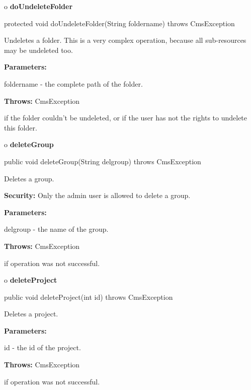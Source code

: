 o {\bf doUndeleteFolder}

\begin{PRE}
 protected void doUndeleteFolder(String foldername) throws CmsException
\end{PRE}

\begin{description}
\htmlDD Undeletes a folder. \htmlBR
This is a very complex operation, because all sub-resources may be undeleted
too.

\begin{description}
\item {\bf Parameters:}

foldername - the complete path of the folder.
\item {\bf Throws:} CmsException

if the folder couldn't be undeleted, or if the user has not the rights to
undelete this folder.
\end{description}

\end{description}

o {\bf deleteGroup}

\begin{PRE}
 public void deleteGroup(String delgroup) throws CmsException
\end{PRE}

\begin{description}
\htmlDD Deletes a group.

{\bf Security:} Only the admin user is allowed to delete a group.

\begin{description}
\item {\bf Parameters:}

delgroup - the name of the group.
\item {\bf Throws:} CmsException

if operation was not successful.
\end{description}

\end{description}

o {\bf deleteProject}

\begin{PRE}
 public void deleteProject(int id) throws CmsException
\end{PRE}

\begin{description}
\htmlDD Deletes a project.

\begin{description}
\item {\bf Parameters:}

id - the id of the project.
\item {\bf Throws:} CmsException

if operation was not successful.
\end{description}

\end{description}

